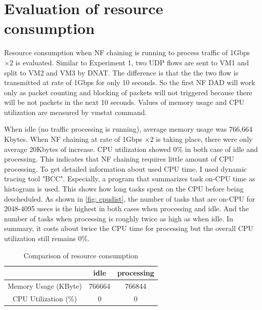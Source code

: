\section{Evaluation of resource consumption}
Resource consumption when NF chaining is running to process traffic of 1Gbps $\times 2 $ is evaluated. Similar to Experiment 1, two UDP flows are sent to VM1 and split to VM2 and VM3 by DNAT. The difference is that the the two flow is transmitted at rate of 1Gbps for only 10 seconds. So the first NF DAD will work only as packet counting and blocking of packets will not triggered because there will be not packets in the next 10 seconds. Values of memory usage and CPU utilization are measured by vmstat command. 

When idle (no traffic processing is running), average memory usage was 766,664 Kbytes. When NF chaining at rate of 1Gbps $\times 2 $ is taking place, there were only average 20Kbytes of increase. CPU utilization showed 0\% in both case of idle and processing. This indicates that NF chaining requires little amount of CPU processing. To get detailed information about used CPU time, I used dynamic tracing tool "BCC". Especially, a program that summarizes task on-CPU time as histogram is used. This shows how long tasks spent on the CPU before being descheduled. As shown in \ref{fig: cpudist}, the number of tasks that are on-CPU for 2048-4095 usecs is the highest in both cases when processing and idle. And the number of tasks when processing is roughly twice as high as when idle. In summary, it costs about twice the CPU time for processing but the overall CPU utilization still remains 0\%. 

\begin{table}
	\centering
	\begin{tabular}{|c|c|c|}
	\hline
	 & idle & processing \\
	 \hline
	 Memory Usage (KByte) & 766664 & 766844 \\
	 \hline
	 CPU Utilization (\%) & 0 & 0 \\
	 \hline
	\end{tabular}
	\caption{Comparison of resource consumption}
	\label{tbl: resource}
\end{table}

